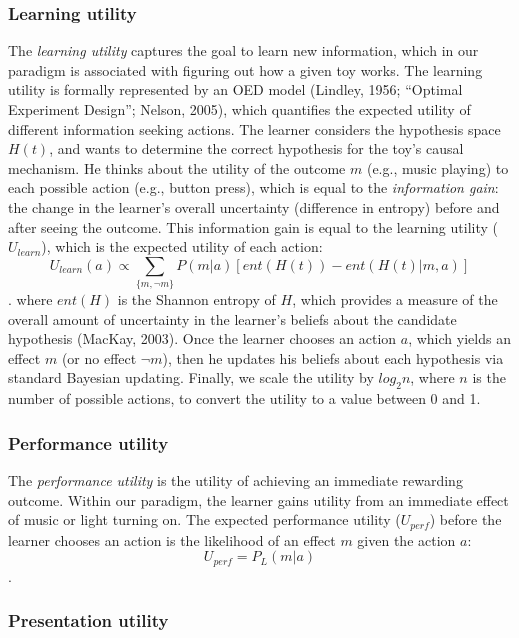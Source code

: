 \documentclass[10pt, letterpaper]{article}
\begin{document}
\subsubsection{Learning utility}\label{learning-utility}

The \emph{learning utility} captures the goal to learn new information,
which in our paradigm is associated with figuring out how a given toy
works. The learning utility is formally represented by an OED model
(Lindley, 1956; ``Optimal Experiment Design''; Nelson, 2005), which
quantifies the expected utility of different information seeking
actions. The learner considers the hypothesis space \(H(t)\), and wants
to determine the correct hypothesis for the toy's causal mechanism. He
thinks about the utility of the outcome \(m\) (e.g., music playing) to
each possible action (e.g., button press), which is equal to the
\emph{information gain}: the change in the learner's overall uncertainty
(difference in entropy) before and after seeing the outcome. This
information gain is equal to the learning utility (\(U_{learn}\)), which
is the expected utility of each action:
\[ U_{learn}(a) \propto \sum_{\{m, \neg m\}}{P(m|a)}[{ent(H(t)) - ent(H(t)|m,a)}]\].
\noindent
where \(ent(H)\) is the Shannon entropy of \(H\), which provides a
measure of the overall amount of uncertainty in the learner's beliefs
about the candidate hypothesis (MacKay, 2003). Once the learner chooses
an action \(a\), which yields an effect \(m\) (or no effect \(\neg m\)),
then he updates his beliefs about each hypothesis via standard Bayesian
updating. Finally, we scale the utility by \(log_2n\), where \(n\) is
the number of possible actions, to convert the utility to a value
between 0 and 1.

\subsubsection{Performance utility}\label{performance-utility}

The \emph{performance utility} is the utility of achieving an immediate
rewarding outcome. Within our paradigm, the learner gains utility from
an immediate effect of music or light turning on. The expected
performance utility (\(U_{perf}\)) before the learner chooses an action
is the likelihood of an effect \(m\) given the action \(a\):
\[ U_{perf} = P_L(m | a) \]. \noindent

\subsubsection{Presentation utility}\label{presentation-utility}
\end{document}
